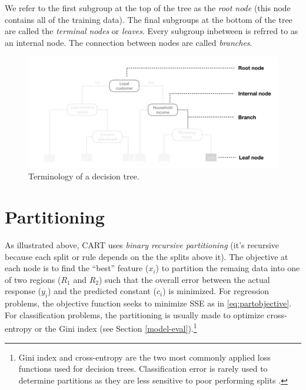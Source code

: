 \documentclass[]{krantz}
\begin{document}
We refer to the first subgroup at the top of the tree as the \emph{root node} (this node contains all of the training data). The final subgroups at the bottom of the tree are called the \emph{terminal nodes} or \emph{leaves}. Every subgroup inbetween is refrred to as an internal node. The connection between nodes are called \emph{branches}.

\begin{figure}

{\centering \includegraphics[width=0.8\linewidth,height=0.8\textheight]{images/decision-tree-terminology} 

}

\caption{Terminology of a decision tree.}\label{fig:decision-tree-terminology}
\end{figure}

\hypertarget{partitioning}{%
\section{Partitioning}\label{partitioning}}

As illustrated above, CART uses \emph{binary recursive partitioning} (it's recursive because each split or rule depends on the the splits above it). The objective at each node is to find the ``best'' feature (\(x_i\)) to partition the remaing data into one of two regions (\(R_1\) and \(R_2\)) such that the overall error between the actual response (\(y_i\)) and the predicted constant (\(c_i\)) is minimized. For regression problems, the objective function seeks to minimize SSE as in \eqref{eq:partobjective}. For classification problems, the partitioning is usually made to optimize cross-entropy or the Gini index (see Section \ref{model-eval}).\footnote{Gini index and cross-entropy are the two most commonly applied loss functions used for decision trees. Classification error is rarely used to determine partitions as they are less sensitive to poor performing splits \citep{esl}.}
\end{document}
